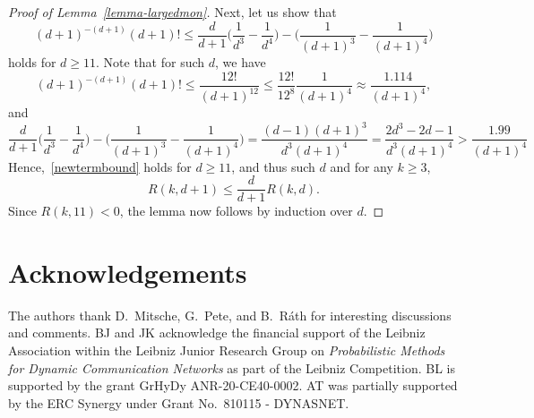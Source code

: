 \documentclass[oneside]{amsart}
\theoremstyle{definition}
\newcommand{\1}{\mathbbm{1}}
\newcommand{\0}{\mathbf{o}}
\numberwithin{equation}{section}
\begin{document}
\begin{proof}[Proof of Lemma~\ref{lemma-largedmon}]
Next, let us show that
\begin{equation}\label{newtermbound} (d+1)^{-(d+1)} (d+1)! \leq \frac{d}{d+1} \big( \frac{1}{d^3}-\frac{1}{d^4} \big) - \Big( \frac{1}{(d+1)^3} - \frac{1}{(d+1)^4} \Big) \end{equation}
holds for $d \geq 11$. Note that for such $d$, we have
\[ (d+1)^{-(d+1)} (d+1)! \leq \frac{12!}{(d+1)^{12}} \leq \frac{12!}{12^8} \frac{1}{(d+1)^4} \approx \frac{1.114}{(d+1)^4}, \]
and
\[ \frac{d}{d+1} \Big( \frac{1}{d^3}-\frac{1}{d^4} \Big) - \Big( \frac{1}{(d+1)^3} - \frac{1}{(d+1)^4} \Big) = \frac{(d-1)(d+1)^3}{d^3(d+1)^4} = \frac{2d^3-2d-1}{d^3(d+1)^4} > \frac{1.99}{(d+1)^4} \]
Hence,~\eqref{newtermbound} holds for $d \geq 11$, and thus such $d$ and for any $k\geq 3$,
\[ R(k,d+1) \leq \frac{d}{d+1} R(k,d). \]
Since $R(k,11) < 0$, the lemma now follows by induction over $d$.
\end{proof}


\section*{Acknowledgements}
The authors thank D.~Mitsche, G.~Pete, and B.~Ráth for interesting discussions and comments. BJ and JK acknowledge the financial support of the Leibniz Association within the Leibniz Junior Research Group on \textit{Probabilistic Methods for Dynamic Communication Networks} as part of the Leibniz Competition. BL is supported by the grant GrHyDy ANR-20-CE40-0002. AT  was partially supported by the ERC Synergy under
Grant No.\ 810115 - DYNASNET. 


\printbibliography
\end{document}
